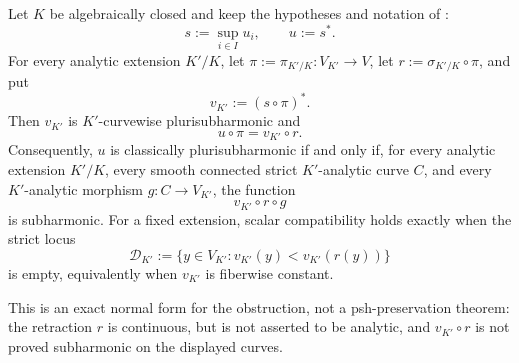 \begin{corollary}
\label{cor:p031-affine-canonical-retraction-reduction}
Let $K$ be algebraically closed and keep the hypotheses and notation of
:
\[
                  s:=\sup_{i\in I}u_i,
                  \qquad u:=s^*.
\]
For every analytic extension $K'/K$, let $\pi:=\pi_{K'/K}:V_{K'}\to V$,
let $r:=\sigma_{K'/K}\circ\pi$, and put
\[
                         v_{K'}:=(s\circ\pi)^*.
\]
Then $v_{K'}$ is $K'$-curvewise plurisubharmonic and
\begin{equation}
\label{eq:p031-affine-canonical-retraction-identity}
                         u\circ\pi=v_{K'}\circ r.
\end{equation}
Consequently, $u$ is classically plurisubharmonic if and only if, for every
analytic extension $K'/K$, every smooth connected strict $K'$-analytic
curve $C$, and every $K'$-analytic morphism $g:C\to V_{K'}$, the function
\begin{equation}
\label{eq:p031-affine-retracted-curve-test}
                         v_{K'}\circ r\circ g
\end{equation}
is subharmonic.  For a fixed extension, scalar compatibility holds exactly
when the strict locus
\[
       \mathcal D_{K'}
          :=\{y\in V_{K'}:v_{K'}(y)<v_{K'}(r(y))\}
\]
is empty, equivalently when $v_{K'}$ is fiberwise constant.

This is an exact normal form for the obstruction, not a
psh-preservation theorem: the retraction $r$ is continuous, but is not
asserted to be analytic, and $v_{K'}\circ r$ is not proved subharmonic on
the displayed curves.
\end{corollary}
